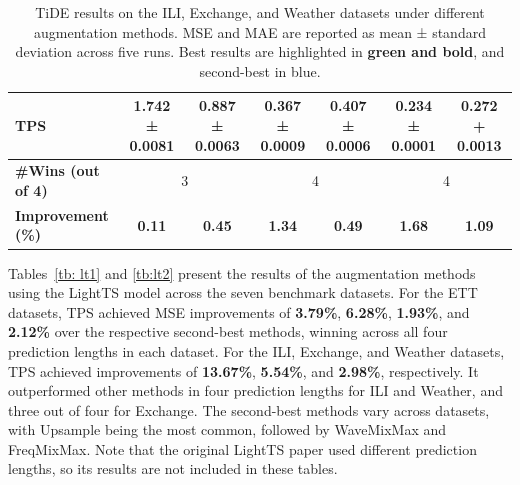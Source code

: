\begin{table}[h!]
\begin{adjustbox}{max width=\textwidth}
\begin{tabular}{l|cc|cc|cc}
    TPS    & \cellcolor{bestcolor}\textbf{1.742 ± 0.0081} & \cellcolor{bestcolor}\textbf{0.887 ± 0.0063} & \cellcolor{bestcolor}\textbf{0.367 ± 0.0009} & \cellcolor{bestcolor}\textbf{0.407 ± 0.0006} & \cellcolor{bestcolor}\textbf{0.234 ± 0.0001} & \cellcolor{bestcolor}\textbf{0.272 + 0.0013} \\
    \midrule
    \textbf{\#Wins (out of 4)} & \multicolumn{2}{c|}{3} & \multicolumn{2}{c|}{4} & \multicolumn{2}{c}{4} \\
    \textbf{Improvement (\%)} & \cellcolor{bestcolor} \textbf{0.11} & \cellcolor{bestcolor} \textbf{0.45} & \cellcolor{bestcolor} \textbf{1.34} & \cellcolor{bestcolor} \textbf{0.49} & \cellcolor{bestcolor} \textbf{1.68} & \cellcolor{bestcolor} \textbf{1.09} \\
    \bottomrule
\end{tabular}
\end{adjustbox}
\caption{TiDE results on the ILI, Exchange, and Weather datasets under different augmentation methods. MSE and MAE are reported as mean ± standard deviation across five runs. Best results are highlighted in \textbf{green and bold}, and second-best in blue.}
\label{tb: tide2}
\end{table}


Tables~\ref{tb: lt1} and \ref{tb:lt2} present the results of the augmentation methods using the LightTS model across the seven benchmark datasets. For the ETT datasets, TPS achieved MSE improvements of \textbf{3.79\%}, \textbf{6.28\%}, \textbf{1.93\%}, and \textbf{2.12\%} over the respective second-best methods, winning across all four prediction lengths in each dataset. For the ILI, Exchange, and Weather datasets, TPS achieved improvements of \textbf{13.67\%}, \textbf{5.54\%}, and \textbf{2.98\%}, respectively. It outperformed other methods in four prediction lengths for ILI and Weather, and three out of four for Exchange. The second-best methods vary across datasets, with Upsample being the most common, followed by WaveMixMax and FreqMixMax. Note that the original LightTS paper used different prediction lengths, so its results are not included in these tables.



